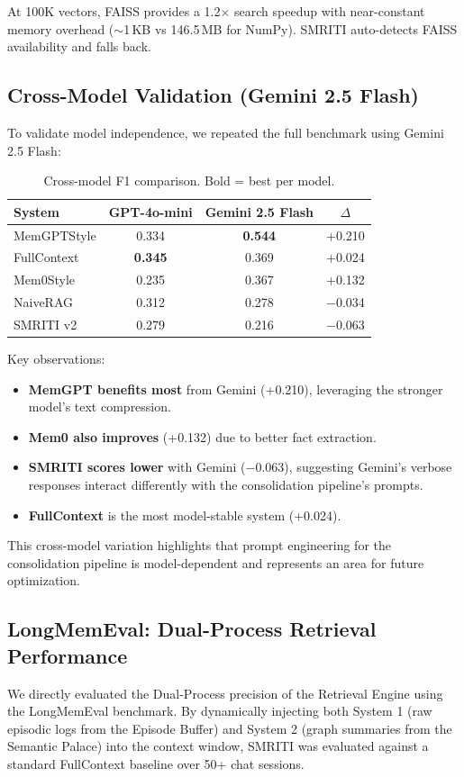 \documentclass[conference]{IEEEtran}
\begin{document}
At 100K vectors, FAISS provides a 1.2$\times$ search speedup with near-constant memory overhead ($\sim$1\,KB vs 146.5\,MB for NumPy). SMRITI auto-detects FAISS availability and falls back.

\subsection{Cross-Model Validation (Gemini 2.5 Flash)}
To validate model independence, we repeated the full benchmark using Gemini 2.5 Flash:

\begin{table}[ht]
\caption{Cross-model F1 comparison. Bold = best per model.}
\label{tab:cross_model}
\begin{center}
\begin{tabular}{lccc}
\toprule
\textbf{System} & \textbf{GPT-4o-mini} & \textbf{Gemini 2.5 Flash} & \textbf{$\Delta$} \\
\midrule
MemGPTStyle & 0.334 & \textbf{0.544} & +0.210 \\
FullContext & \textbf{0.345} & 0.369 & +0.024 \\
Mem0Style & 0.235 & 0.367 & +0.132 \\
NaiveRAG & 0.312 & 0.278 & $-$0.034 \\
SMRITI v2 & 0.279 & 0.216 & $-$0.063 \\
\bottomrule
\end{tabular}
\end{center}
\end{table}

Key observations:
\begin{itemize}
    \item \textbf{MemGPT benefits most} from Gemini (+0.210), leveraging the stronger model's text compression.
    \item \textbf{Mem0 also improves} (+0.132) due to better fact extraction.
    \item \textbf{SMRITI scores lower} with Gemini ($-$0.063), suggesting Gemini's verbose responses interact differently with the consolidation pipeline's prompts.
    \item \textbf{FullContext} is the most model-stable system (+0.024).
\end{itemize}
This cross-model variation highlights that prompt engineering for the consolidation pipeline is model-dependent and represents an area for future optimization.

\subsection{LongMemEval: Dual-Process Retrieval Performance}
We directly evaluated the Dual-Process precision of the Retrieval Engine using the LongMemEval benchmark. By dynamically injecting both System 1 (raw episodic logs from the Episode Buffer) and System 2 (graph summaries from the Semantic Palace) into the context window, SMRITI was evaluated against a standard FullContext baseline over 50+ chat sessions.
\end{document}
